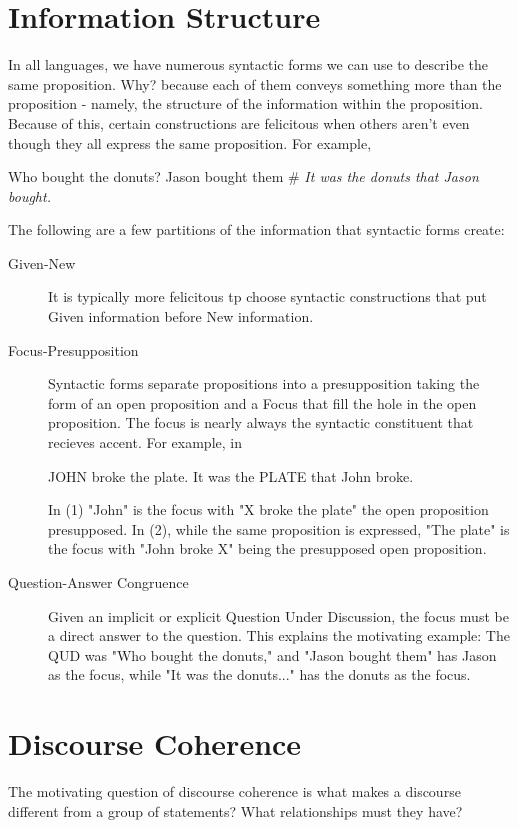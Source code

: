 \documentclass[11pt]{article}
\begin{document}
\section{Information Structure}
\par
In all languages, we have numerous syntactic forms we can use to describe the same proposition. Why?
because each of them conveys something more than the proposition - namely, the structure of the 
information within the proposition. Because of this, certain constructions are felicitous when 
others aren't even though they all express the same proposition. For example,

\begin{exe}
    \ex Who bought the donuts?
    \ex Jason bought them
    \ex \# \textit{It was the donuts that Jason bought.}
\end{exe}

The following are a few partitions of the information that syntactic forms create:

\begin{description}
    \item[Given-New] It is typically more felicitous tp choose syntactic constructions that put Given 
        information before New information.
    \item[Focus-Presupposition] Syntactic forms separate propositions into a presupposition taking the
        form of an open proposition and a Focus that fill the hole in the open proposition. The focus
        is nearly always the syntactic constituent that recieves accent. For example, in

        \begin{exe}
            \ex JOHN broke the plate.
            \ex It was the PLATE that John broke.
        \end{exe}
        In (1) "John" is the focus with "X broke the plate" the open proposition presupposed. In (2),
        while the same proposition is expressed, "The plate" is the focus with "John broke X" being 
        the presupposed open proposition.
    \item[Question-Answer Congruence] Given an implicit or explicit Question Under Discussion, the 
        focus must be a direct answer to the question. This explains the motivating example: The
        QUD was "Who bought the donuts," and "Jason bought them" has Jason as the focus, while
        "It was the donuts..." has the donuts as the focus. 
\end{description}

\section{Discourse Coherence}
\par
The motivating question of discourse coherence is what makes a discourse different from a group of
statements? What relationships must they have?
\end{document}
